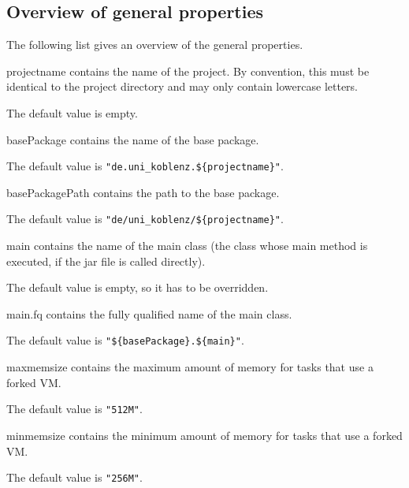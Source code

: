 \documentclass[a4paper,twoside,11pt,bibtotoc]{article}
\begin{document}
\subsection{Overview of general properties}
The following list gives an overview of the general properties.
\begin{description*}
	\item[projectname] contains the name of the project. By convention, this must be identical to the project directory and may only contain lowercase letters.\par The default value is empty.
	\item[basePackage] contains the name of the base package.\par The default value is \texttt{"de.uni\_koblenz.\$\{projectname\}"}.
	\item[basePackagePath] contains the path to the base package.\par The default value is \texttt{"de/uni\_koblenz/\$\{projectname\}"}.
	\item[main] contains the name of the main class (the class whose main method is executed, if the jar file is called directly).\par The default value is empty, so it has to be overridden.
	\item[main.fq] contains the fully qualified name of the main class.\par The default value is \texttt{"\$\{basePackage\}.\$\{main\}"}.
	\item[maxmemsize] contains the maximum amount of memory for tasks that use a forked VM.\par The default value is \texttt{"512M"}.
	\item[minmemsize] contains the minimum amount of memory for tasks that use a forked VM.\par The default value is \texttt{"256M"}.
\end{description*}	
\end{document}
